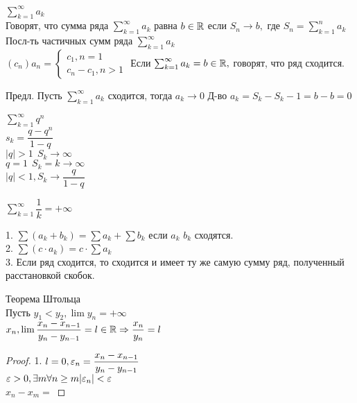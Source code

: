 
\begin{definition}
	$ \sum_{k=1}^{\infty} a_k $\\
	Говорят, что сумма ряда $  \sum_{k=1}^{\infty} a_k $ равна  $ b \in \mathbb{R} $ если $ S_n \rightarrow b, $ где $ S_n =  \sum_{k=1}^{n} a_k$
	Посл-ть частичных сумм ряда $  \sum_{k=1}^{\infty} a_k$ \\
	$ (c_n) a_n = \left\{ \begin{matrix}
		c_1, n = 1 \\
		c_n - c_1, n > 1 
	\end{matrix} \right. $ 
	Если $  \sum_{k=1}^{\infty} a_k = b \in \mathbb{R}, $ говорят, что ряд сходится.
\end{definition}
Предл. Пусть $  \sum_{k=1}^{\infty} a_k $ сходится, тогда $ a_k \rightarrow 0 $ 
Д-во $ a_k = S_k - S_k-1 = b - b = 0$\\
\begin{example}
	 $ \sum_{k=1}^{\infty} q^n $\\
	 $ s_k = \dfrac{q - q^n}{1 - q} $ \\
	 $ |q | > 1\ \ S_k \rightarrow \infty $ \\
	 $ q = 1 \ \ S_k = k \rightarrow \infty $ \\
	 $ | q | < 1, S_k \rightarrow \dfrac{q}{1- q} $ \\
\end{example}
\begin{example}
	$  \sum_{k=1}^{\infty} \dfrac{1}{k} = +\infty $ \\
\end{example}
\begin{properties}
	1. $ \sum(a_k + b_k) = \sum a_k + \sum b_k $ если $a_k $ $ b_k $ сходятся.\\
	2. $ \sum (c \cdot a_k ) = c \cdot \sum a_k $ \\
	3. Если ряд сходится, то сходится и имеет ту же самую сумму ряд, полученный расстановкой скобок. \\
	
\end{properties}
\begin{theorem} Теорема Штольца \\
	Пусть $ y_1 < y_2, \lim y_n =  +\infty $ \\
	$ x_n, \lim \dfrac{x_n - x_{n-1}}{y_n - y_{n-1}} = l \in \mathbb{R} \Rightarrow \dfrac{x_n}{y_n} = l $
	\begin{proof}
		1. $ l = 0, \varepsilon_n = \dfrac{x_n - x_{n-1}}{y_n - y_{n-1}} $ \\
		$ \varepsilon > 0, \exists m \forall n \geq m |\varepsilon_n | < \varepsilon $ \\
		$ x_n - x_m = $
	\end{proof}
\end{theorem}
